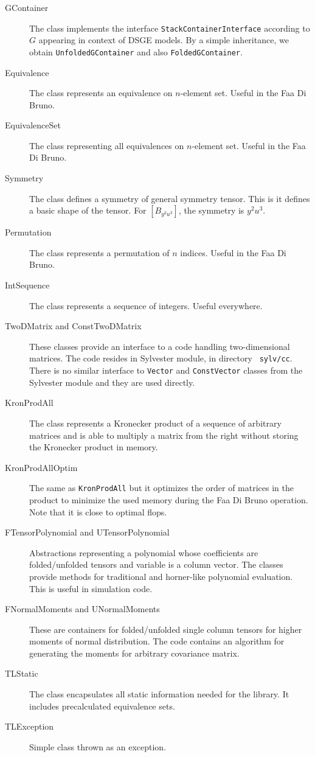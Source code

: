 \documentclass[11pt,a4paper]{article}
\begin{document}
\begin{description}
\item[GContainer] 
The class implements the interface \texttt{StackContainerInterface} according
to $G$ appearing in context of DSGE models. By a simple inheritance,
we obtain \texttt{UnfoldedGContainer} and also \texttt{FoldedGContainer}.
\item[Equivalence] 
The class represents an equivalence on $n$-element set. Useful in the
Faa Di Bruno.
\item[EquivalenceSet] 
The class representing all equivalences on $n$-element set. Useful in the
Faa Di Bruno.
\item[Symmetry] 
The class defines a symmetry of general symmetry tensor. This is it
defines a basic shape of the tensor. For $\left[B_{y^2u^3}\right]$,
the symmetry is $y^2u^3$.
\item[Permutation] 
The class represents a permutation of $n$ indices. Useful in the
Faa Di Bruno.
\item[IntSequence] 
The class represents a sequence of integers. Useful everywhere.
\item[TwoDMatrix and ConstTwoDMatrix] 
These classes provide an interface to a code handling two-dimensional
matrices. The code resides in Sylvester module, in directory {\tt
sylv/cc}. There is
no similar interface to \texttt{Vector} and \texttt{ConstVector} classes from the
Sylvester module and they are used directly.
\item[KronProdAll] 
The class represents a Kronecker product of a sequence of arbitrary
matrices and is able to multiply a matrix from the right without
storing the Kronecker product in memory.
\item[KronProdAllOptim] 
The same as \texttt{KronProdAll} but it optimizes the order of matrices in
the product to minimize the used memory during the Faa Di Bruno
operation. Note that it is close to optimal flops.
\item[FTensorPolynomial and UTensorPolynomial] 
Abstractions representing a polynomial whose coefficients are
folded/unfolded tensors and variable is a column vector. The classes
provide methods for traditional and horner-like polynomial
evaluation. This is useful in simulation code.
\item[FNormalMoments and UNormalMoments] 
These are containers for folded/unfolded single column tensors for
higher moments of normal distribution. The code contains an algorithm
for generating the moments for arbitrary covariance matrix.
\item[TLStatic] 
The class encapsulates all static information needed for the
library. It includes precalculated equivalence sets.
\item[TLException] 
Simple class thrown as an exception.
\end{description}
\end{document}
